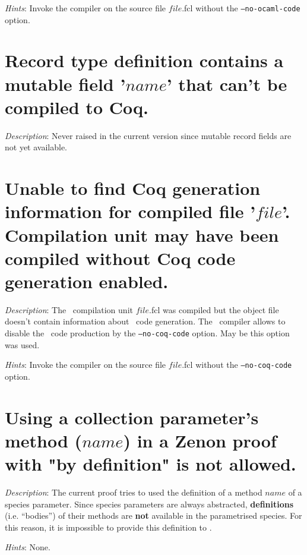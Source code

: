 {\em Hints}: Invoke the compiler on the source file $file$.fcl without
the {\tt --no-ocaml-code} option.



\section*{Record type definition contains a mutable field '$name$' that can't
  be compiled to Coq.}

{\em Description}: {\color{red} Never raised in the current version
  since mutable record fields are not yet available}.



\section*{Unable to find Coq generation information for compiled file
  '$file$'. Compilation unit may have been compiled without Coq code
  generation enabled.}

{\em Description}: The \focal\ compilation unit $file$.fcl was
compiled but the object file doesn't contain information about \coq\
code generation. The \focal\ compiler allows to disable the \coq\ code
production by the {\tt --no-coq-code} option. May be this option was
used.

{\em Hints}: Invoke the compiler on the source file $file$.fcl without
the {\tt --no-coq-code} option.



\section*{Using a collection parameter's method ($name$) in a Zenon proof
  with "by definition" is not allowed.}

{\em Description}: The current proof tries to used the definition of a
method $name$ of a species parameter. Since species parameters are
always abstracted, {\bf definitions} (i.e. ``bodies'') of their methods
are {\bf not} available in the parametrised species. For this reason,
it is impossible to provide this definition to \zenon.

{\em Hints}: None.



